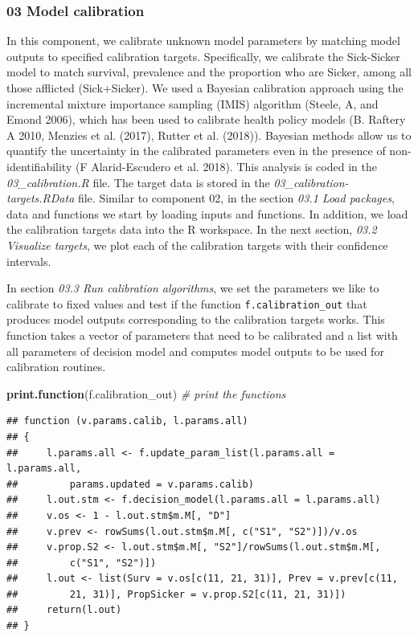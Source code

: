 \documentclass[]{article}
\newenvironment{Shaded}{\begin{snugshade}}{\end{snugshade}}
\newcommand{\KeywordTok}[1]{\textcolor[rgb]{0.13,0.29,0.53}{\textbf{#1}}}
\newcommand{\CommentTok}[1]{\textcolor[rgb]{0.56,0.35,0.01}{\textit{#1}}}
\newcommand{\NormalTok}[1]{#1}
\begin{document}
\subsubsection{03 Model calibration}\label{model-calibration}

In this component, we calibrate unknown model parameters by matching
model outputs to specified calibration targets. Specifically, we
calibrate the Sick-Sicker model to match survival, prevalence and the
proportion who are Sicker, among all those afflicted (Sick+Sicker). We
used a Bayesian calibration approach using the incremental mixture
importance sampling (IMIS) algorithm (Steele, A, and Emond 2006), which
has been used to calibrate health policy models (B. Raftery A 2010,
Menzies et al. (2017), Rutter et al. (2018)). Bayesian methods allow us
to quantify the uncertainty in the calibrated parameters even in the
presence of non-identifiability (F Alarid-Escudero et al. 2018). This
analysis is coded in the \emph{03\_calibration.R} file. The target data
is stored in the \emph{03\_calibration-targets.RData} file. Similar to
component 02, in the section \emph{03.1 Load packages}, data and
functions we start by loading inputs and functions. In addition, we load
the calibration targets data into the R workspace. In the next section,
\emph{03.2 Visualize targets}, we plot each of the calibration targets
with their confidence intervals.

In section \emph{03.3 Run calibration algorithms}, we set the parameters
we like to calibrate to fixed values and test if the function
\texttt{f.calibration\_out} that produces model outputs corresponding to
the calibration targets works. This function takes a vector of
parameters that need to be calibrated and a list with all parameters of
decision model and computes model outputs to be used for calibration
routines.

\begin{Shaded}
\begin{Highlighting}[]
\KeywordTok{print.function}\NormalTok{(f.calibration_out) }\CommentTok{# print the functions}
\end{Highlighting}
\end{Shaded}

\begin{verbatim}
## function (v.params.calib, l.params.all) 
## {
##     l.params.all <- f.update_param_list(l.params.all = l.params.all, 
##         params.updated = v.params.calib)
##     l.out.stm <- f.decision_model(l.params.all = l.params.all)
##     v.os <- 1 - l.out.stm$m.M[, "D"]
##     v.prev <- rowSums(l.out.stm$m.M[, c("S1", "S2")])/v.os
##     v.prop.S2 <- l.out.stm$m.M[, "S2"]/rowSums(l.out.stm$m.M[, 
##         c("S1", "S2")])
##     l.out <- list(Surv = v.os[c(11, 21, 31)], Prev = v.prev[c(11, 
##         21, 31)], PropSicker = v.prop.S2[c(11, 21, 31)])
##     return(l.out)
## }
\end{verbatim}
\end{document}
